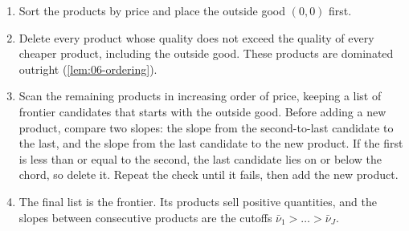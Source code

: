 \begin{enumerate}[label=Step \arabic*.,leftmargin=*]
  \item Sort the products by price and place the outside good $(0,0)$ first.
  \item Delete every product whose quality does not exceed the quality of every cheaper product, including
        the outside good. These products are dominated outright (\cref{lem:06-ordering}).
  \item Scan the remaining products in increasing order of price, keeping a list of frontier candidates
        that starts with the outside good. Before adding a new product, compare two slopes: the slope
        from the second-to-last candidate to the last, and the slope from the last candidate to the new
        product. If the first is less than or equal to the second, the last candidate lies on or below the
        chord, so delete it. Repeat the check until it fails, then add the new product.
  \item The final list is the frontier. Its products sell positive quantities, and the slopes between
        consecutive products are the cutoffs $\bar\nu_1 > \dots > \bar\nu_J$.
\end{enumerate}

